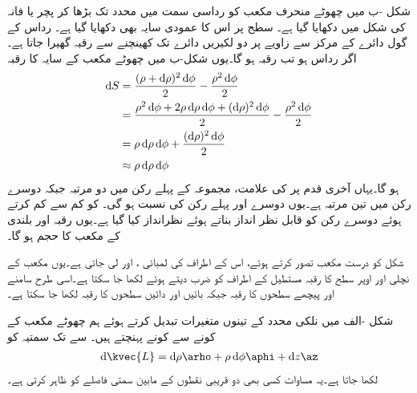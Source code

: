 شکل -ب میں چھوٹے منحرف مکعب کو رداسی سمت میں  محدد تک بڑھا کر پچر یا فانہ کی شکل میں دکھایا گیا ہے۔ سطح پر اس کا عمودی سایہ بھی دکھایا گیا ہے۔ رداس کے گول دائرے  کے مرکز سے   زاویے پر دو لکیریں دائرے تک کھینچنے سے   رقبہ گھیرا جاتا ہے۔اگر رداس  ہو تب رقبہ  ہو گا۔یوں شکل-ب میں چھوٹے مکعب کے سایہ  کا رقبہ 
\begin{align*}
\dif S&=\frac{(\rho+\dif \rho)^2 \dif \phi}{2} - \frac{\rho^2 \dif \phi}{2}\\
&=\frac{\rho^2 \dif \phi +2 \rho \dif \rho \dif \phi+(\dif \rho)^2 \dif \phi}{2}-\frac{\rho^2 \dif \phi}{2}\\
&=\rho \dif \rho \dif \phi+\frac{(\dif \rho)^2 \dif \phi}{2}\\
&\approx \rho \dif \rho \dif \phi
\end{align*}
ہو گا۔یہاں آخری قدم پر  کی علامت، مجموعہ کے پہلے رکن میں دو مرتبہ  جبکہ دوسرے رکن میں تین مرتبہ ہے۔یوں دوسرے اور پہلے رکن کی نسبت
   ہو گی۔ کو کم سے کم کرتے ہوئے دوسرے رکن کو قابل نظر انداز بناتے ہوئے نظرانداز کیا گیا ہے۔یوں  رقبہ اور  بلندی کے مکعب کا حجم  ہو گا۔

شکل  کو درست مکعب تصور کرتے ہوئے، اس کے اطراف کی لمبائی ،  اور  لی جاتی ہے۔یوں مکعب کے نچلی اور اوپر سطح کا رقبہ مستطیل کے اطراف کو ضرب دیتے ہوئے   لکھا جا سکتا ہے۔اسی طرح سامنے اور پیچھے سطحوں  کا رقبہ  جبکہ بائیں اور دائیں سطحوں کا رقبہ  لکھا جا سکتا ہے۔


شکل -الف میں نلکی محدد کے تینوں متغیرات تبدیل کرتے ہوئے ہم چھوٹے مکعب کے   کونے سے  کونے پہنچتے ہیں۔ سے  تک سمتیہ کو
\begin{align}\label{مساوات_سمتیہ_نلکی_چھوٹا_فاصلہ}
\dif \kvec{L}=\dif \rho \arho+\rho \dif \phi \aphi+\dif z \az
\end{align}
لکھا جاتا ہے۔یہ مساوات کسی بھی دو قریبی نقطوں کے مابین سمتی فاصلے کو ظاہر کرتی ہے۔

